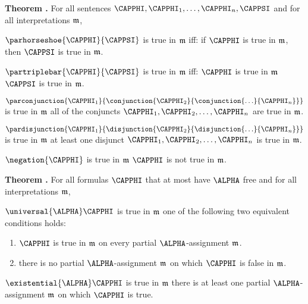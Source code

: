 \begin{majorILnc}{\textbf{Theorem .}} For all \GQL{} sentences $\CAPPHI,\CAPPHI_1,\ldots,\CAPPHI_{\integer{n}},\CAPPSI$ and for all interpretations $\mathfrak{m}$,
\begin{cenumerate}
\item $\parhorseshoe{\CAPPHI}{\CAPPSI}$ is true in $\mathfrak{m}$ iff: if $\CAPPHI$ is true in $\mathfrak{m}$, then $\CAPPSI$ is true in $\mathfrak{m}$.
\item $\partriplebar{\CAPPHI}{\CAPPSI}$ is true in $\mathfrak{m}$ iff: $\CAPPHI$ is true in $\mathfrak{m}$ \Iff $\CAPPSI$ is true in $\mathfrak{m}$.
\item $\parconjunction{\CAPPHI_1}{\conjunction{\CAPPHI_2}{\conjunction{\ldots}{\CAPPHI_{\integer{n}}}}}$ is true in $\mathfrak{m}$ \Iff all of the conjuncts $\CAPPHI_1,\CAPPHI_2,\ldots,\CAPPHI_{\integer{n}}$ are true in $\mathfrak{m}$.
\item $\pardisjunction{\CAPPHI_1}{\disjunction{\CAPPHI_2}{\disjunction{\ldots}{\CAPPHI_{\integer{n}}}}}$ is true in $\mathfrak{m}$ \Iff at least one disjunct $\CAPPHI_1,\CAPPHI_2,\ldots,\CAPPHI_{\integer{n}}$ is true in $\mathfrak{m}$.
\item $\negation{\CAPPHI}$ is true in $\mathfrak{m}$ \Iff $\CAPPHI$ is not true in $\mathfrak{m}$.
\end{cenumerate}
\end{majorILnc}

\begin{majorILnc}{\textbf{Theorem .}} For all \GQL{} formulas $\CAPPHI$ that at most have $\ALPHA$ free and for all interpretations $\mathfrak{m}$,
\begin{cenumerate}
\item $\universal{\ALPHA}\CAPPHI$ is true in $\mathfrak{m}$ \Iff one of the following two equivalent conditions holds:
\begin{enumerate}
\item $\CAPPHI$ is true in $\mathfrak{m}$ on every partial $\ALPHA$-assignment $\mathfrak{m^{\mathrm{}}_{\mathrm{}}}$.
\item there is no partial $\ALPHA$-assignment $\mathfrak{m^{\mathrm{}}_{\mathrm{}}}$ on which $\CAPPHI$ is false in $\mathfrak{m}$.
\end{enumerate} 
\item $\existential{\ALPHA}\CAPPHI$ is true in $\mathfrak{m}$ \Iff there is at least one partial $\ALPHA$-assignment $\mathfrak{m^{\mathrm{}}_{\mathrm{}}}$ on which $\CAPPHI$ is true.
\end{cenumerate}
\end{majorILnc}

